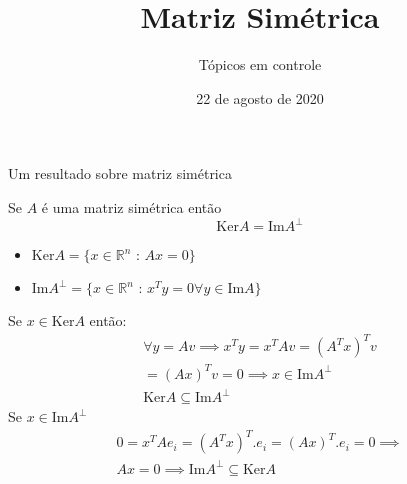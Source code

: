 \documentclass{beamer}
\title[]{Matriz Simétrica}
\author{Tópicos em controle}
\institute{IME USP}
\date{22 de agosto de 2020}
\begin{document}
\begin{frame}
  \titlepage
\end{frame}

\begin{frame}{Um resultado sobre matriz simétrica}

  Se $A$ é uma matriz simétrica então  
  $$ \text{Ker}A = \text{Im}A^{\bot}$$
  \begin{itemize}
    \item $\text{Ker}A = \{x\in \mathbb{R}^n \text{ : }  Ax=0\}$
    \item $\text{Im}A^\bot =\{ x \in \mathbb{R}^n \text{ : } x^T y = 0 \forall y \in \text{Im}A\}$
  \end{itemize}
  
\end{frame}

\begin{frame}

Se $x\in \text{Ker}A$ então:
\begin{gather*}
  \forall y = Av \implies x^Ty = x^T A v = (A^Tx)^Tv \\
  = (Ax)^Tv = 0 \implies x\in \text{Im}A^\bot \\
  \text{Ker}A \subseteq \text{Im}A^{\bot}
\end{gather*}
Se $x\in \text{Im}A^\bot$
\begin{gather*}
  0=x^TAe_i =(A^Tx)^T.e_i = (Ax)^T.e_i=0 \implies \\
  Ax=0 \implies \text{Im}A^\bot \subseteq \text{Ker}A
\end{gather*}


\end{frame}
\end{document}
